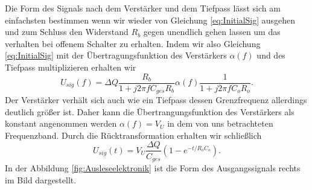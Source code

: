 Die Form des Signals nach dem Verstärker und dem Tiefpass lässt sich am einfachsten bestimmen wenn wir wieder von Gleichung \eqref{eq:InitialSig} ausgehen und zum Schluss  den Widerstand $R_b$ gegen unendlich gehen lassen um das verhalten bei offenem Schalter zu erhalten.
Indem wir also Gleichung \eqref{eq:InitialSig} mit der Übertragungsfunktion des Verstärkers $\alpha(f)$ und des Tiefpass multiplizieren erhalten wir
\begin{equation}
U_{sig}(f) = \Delta Q \frac{R_b}{1 + j2\pi f C_{ges}R_b} \alpha(f) \frac{1}{1 + j 2 \pi f C_o R_o}.
\end{equation}
Der Verstärker verhält sich auch wie ein Tiefpass dessen Grenzfrequenz allerdings deutlich größer ist.
Daher kann die Übertrangungsfunktion des Verstärkers als konstant angenommen werden $\alpha(f) = V_U$ in dem von uns betrachteten Frequenzband.
Durch die Rücktransformation erhalten wir schließlich
\begin{equation}
U_{sig}(t) = V_U \frac{\Delta Q}{C_{ges}}(1 - e^{-t/R_oC_o}).
\end{equation}
In der Abbildung \ref{fig:Ausleseelektronik} ist die Form des Ausgangssignals rechts im Bild dargestellt.
